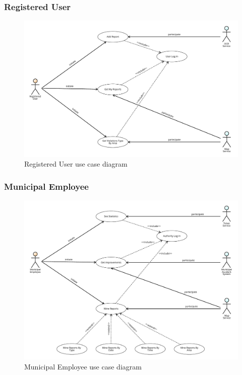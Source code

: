 				\subsubsection{Registered User}
					\begin{figure}[!h]
						\centering
						\includegraphics[width=\textwidth]{images/UseCase/RU.pdf}
						\caption{Registered User use case diagram}
					\end{figure}
				\clearpage
				\subsubsection{Municipal Employee}
					\vspace{-7mm}
					\begin{figure}[!h]
						\centering
						\includegraphics[width=\textwidth]{images/UseCase/ME.pdf}
						\caption{Municipal Employee use case diagram}
					\end{figure}
